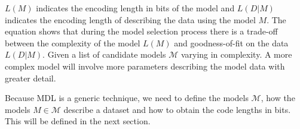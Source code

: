 $L(M)$ indicates the encoding length in bits of the model and $L(D|M)$ indicates the encoding length of describing the data using the model $M$. The equation shows that during the model selection process there is a trade-off between the complexity of the model $L(M)$ and goodness-of-fit on the data $L(D|M)$. Given a list of candidate models $\mathcal{M}$ varying in complexity. A more complex model will involve more parameters describing the model data with greater detail. 

Because MDL is a generic technique, we need to define the models $\mathcal{M}$, how the models $M \in \mathcal{M}$ describe a dataset and how to obtain the code lengths in bits. This will be defined in the next section.




